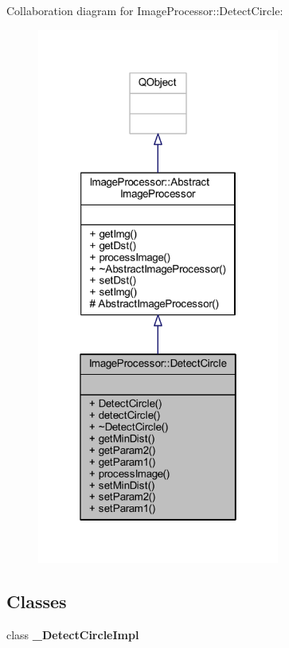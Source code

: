Collaboration diagram for Image\+Processor\+:\+:Detect\+Circle\+:\nopagebreak
\begin{figure}[H]
\begin{center}
\leavevmode
\includegraphics[width=226pt]{d0/d8b/class_image_processor_1_1_detect_circle__coll__graph}
\end{center}
\end{figure}
\subsection*{Classes}
\begin{DoxyCompactItemize}
\item 
class {\bfseries \+\_\+\+Detect\+Circle\+Impl}
\end{DoxyCompactItemize}
